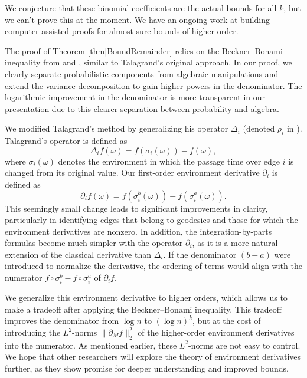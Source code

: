 \documentclass[reqno]{amsart}
\begin{document}
We conjecture that these binomial coefficients are the actual bounds for all $k$, but we can't prove this at the moment. We have an ongoing work at building computer-assisted proofs for almost sure bounds of higher order.

 

The proof of Theorem \ref{thm|BoundRemainder} relies on the Beckner–Bonami inequality from \cite{beckner1975} and \cite{Bonami1970}, similar to Talagrand’s original approach. In our proof, we clearly separate probabilistic components from algebraic manipulations and extend the variance decomposition to gain higher powers in the denominator. The logarithmic improvement in the denominator is more transparent in our presentation due to this clearer separation between probability and algebra.

We modified Talagrand's method by generalizing his operator $\Delta_i$ (denoted $\rho_i$ in \cite{benjamini2006}). Talagrand's operator is defined as 
\[\Delta_if(\omega)=f(\sigma_i(\omega))-f(\omega),\]
 where $\sigma_i(\omega)$ denotes the environment in which the passage time over edge $i$ is changed from its original value. 
 Our first-order environment derivative $\partial_i$ is defined as \[\partial_if(\omega)=f(\sigma_i^b(\omega))-f(\sigma_i^a(\omega)).\] 
 This seemingly small change leads to significant improvements in clarity, particularly in identifying edges that belong to geodesics and those for which the environment derivatives are nonzero. In addition, the integration-by-parts formulas become much simpler with the operator $\partial_i$, as it is a more natural extension of the classical derivative than $\Delta_i$.  If the denominator $(b-a)$ were introduced to normalize the derivative, the ordering of terms would align with the numerator $f\circ\sigma_i^b-f\circ\sigma_i^a$ of $\partial_if$. 
 
We generalize this environment derivative to higher orders, which allows us to make a tradeoff after applying the Beckner–Bonami inequality. This tradeoff improves the denominator from $\log n$ to $(\log n)^k$, 
but at the cost of introducing the $L^2$-norms $\|\partial_Mf\|_2^2$ of the higher-order environment derivatives into the numerator. As mentioned earlier, these $L^2$-norms are not easy to control. 
 We hope that other researchers will explore the theory of environment derivatives further, as they show promise for deeper understanding and improved bounds.
 
\end{document}
